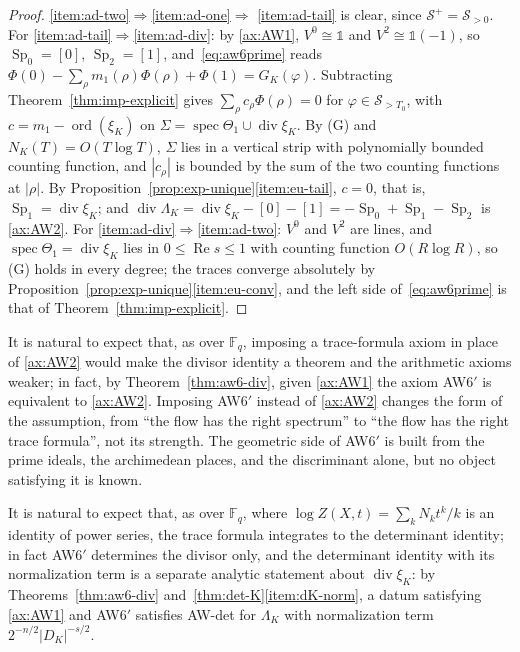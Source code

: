 \documentclass[11pt]{amsart}
\theoremstyle{plain}
\theoremstyle{definition}
\theoremstyle{remark}
\numberwithin{equation}{section}
\newcommand{\F}{\mathbb{F}}
\DeclareMathOperator{\spec}{spec}
\DeclareMathOperator{\divisor}{div}
\DeclareMathOperator{\Rea}{Re}
\DeclareMathOperator{\ord}{ord}
\renewcommand{\Re}{\Rea}
\begin{document}
\begin{proof}
\ref{item:ad-two}$\Rightarrow$\ref{item:ad-one}$\Rightarrow$%
\ref{item:ad-tail} is clear, since $\mathcal S^+=\mathcal S_{>0}$. For
\ref{item:ad-tail}$\Rightarrow$\ref{item:ad-div}: by \ref{ax:AW1},
$V^0\cong\mathbb 1$ and $V^2\cong\mathbb 1(-1)$, so
$\operatorname{Sp}_0=[0]$, $\operatorname{Sp}_2=[1]$,
and~\eqref{eq:aw6prime} reads $\Phi(0)-\sum_\rho m_1(\rho)\Phi(\rho)
+\Phi(1)=G_K(\varphi)$. Subtracting Theorem~\ref{thm:imp-explicit} gives
$\sum_\rho c_\rho\Phi(\rho)=0$ for $\varphi\in\mathcal S_{>T_0}$, with
$c=m_1-\ord(\xi_K)$ on $\Sigma=\spec\Theta_1\cup\divisor\xi_K$. By (G)
and $N_K(T)=O(T\log T)$, $\Sigma$ lies in a vertical strip with
polynomially bounded counting function, and $|c_\rho|$ is bounded by
the sum of the two counting functions at $|\rho|$. By
Proposition~\ref{prop:exp-unique}\ref{item:eu-tail}, $c=0$, that is,
$\operatorname{Sp}_1=\divisor\xi_K$; and $\divisor\Lambda_K=
\divisor\xi_K-[0]-[1]=-\operatorname{Sp}_0+\operatorname{Sp}_1
-\operatorname{Sp}_2$ is \ref{ax:AW2}. For
\ref{item:ad-div}$\Rightarrow$\ref{item:ad-two}: $V^0$ and $V^2$ are
lines, and $\spec\Theta_1=\divisor\xi_K$ lies in $0\le\Re s\le1$ with
counting function $O(R\log R)$, so (G) holds in every degree; the
traces converge absolutely by
Proposition~\ref{prop:exp-unique}\ref{item:eu-conv}, and the left side
of~\eqref{eq:aw6prime} is that of Theorem~\ref{thm:imp-explicit}.
\end{proof}

It is natural to expect that, as over $\F_q$, imposing a trace-formula
axiom in place of \ref{ax:AW2} would make the divisor identity a
theorem and the arithmetic axioms weaker; in fact, by
Theorem~\ref{thm:aw6-div}, given \ref{ax:AW1} the axiom AW6$'$ is
equivalent to \ref{ax:AW2}.
Imposing AW6$'$ instead of \ref{ax:AW2} changes the form of the
assumption, from ``the flow has the right spectrum'' to ``the flow has
the right trace formula'', not its strength. The geometric side of
AW6$'$ is built from the prime ideals, the archimedean places, and the
discriminant alone, but no object satisfying it is known.

It is natural to expect that, as over $\F_q$, where
$\log Z(X,t)=\sum_kN_kt^k/k$ is an identity of power series, the trace
formula integrates to the determinant identity; in fact AW6$'$
determines the divisor only, and the determinant identity with its
normalization term is a separate analytic statement about
$\divisor\xi_K$: by Theorems~\ref{thm:aw6-div}
and~\ref{thm:det-K}\ref{item:dK-norm}, a datum satisfying \ref{ax:AW1}
and AW6$'$ satisfies AW-det for $\Lambda_K$ with normalization term
$2^{-n/2}|D_K|^{-s/2}$.
\end{document}
